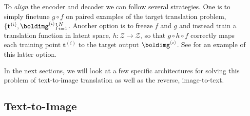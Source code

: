 To \textit{align} the encoder and decoder we can follow several strategies. One is to simply finetune $g \circ f$ on paired examples of the target translation problem, $\{\mathbf{t}^{(i)}, \boldimg^{(i)}\}_{i=1}^N$. Another option is to freeze $f$ and $g$ and instead train a translation function in latent space, $h: \mathcal{Z} \rightarrow \mathcal{Z}$, so that $g \circ h \circ f$ correctly maps each training point $\mathbf{t}^{(i)}$ to the target output $\boldimg^{(i)}$. See \cite{rombach2022high} for an example of this latter option.

In the next sections, we will look at a few specific architectures for solving this problem of text-to-image translation as well as the reverse, image-to-text.






\subsection{Text-to-Image}

